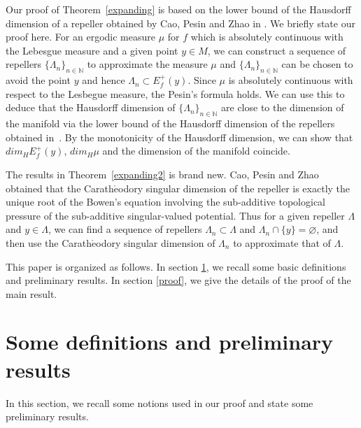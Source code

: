 \documentclass[11pt,a4paper]{amsart}
\theoremstyle{plain}
\theoremstyle{remark}
\begin{document}
	Our proof of Theorem~\ref{expanding} is based on the lower bound of the Hausdorff dimension of a repeller obtained by Cao, Pesin and Zhao in \cite{caopesinzhao2019}. We briefly state our proof here. For an ergodic measure $\mu$ for $f$ which is absolutely continuous with the Lebesgue measure and a given point $y\in M$, we can construct a sequence of repellers $\{\Lambda_n\}_{n\in\mathbb{N}}$  to approximate the measure $\mu$ and  $\{\Lambda_n\}_{n\in\mathbb{N}}$ can be chosen to avoid the point $y$ and hence $\Lambda_n \subset E^{+}_{f}(y)$. Since $\mu$ is absolutely continuous with respect to the Lesbegue measure, the Pesin's formula holds. We can use this to deduce that the Hausdorff dimension of $\{\Lambda_n\}_{n\in\mathbb{N}}$ are close to the dimension of the manifold via the lower bound of the Hausdorff dimension of the repellers obtained in~\cite{caopesinzhao2019}. By the monotonicity of the Hausdorff dimension, we can show that $dim_H E^{+}_{f}(y)$, $dim_H \mu$ and the dimension of the manifold coincide.
	
	The results in Theorem~\ref{expanding2} is brand new. Cao, Pesin and Zhao \cite{caopesinzhao2019} obtained that the Carath$\acute{\text{e}}$odory singular dimension of the repeller is exactly the unique root of the Bowen's equation involving the sub-additive topological pressure of the sub-additive singular-valued potential. Thus for a given repeller $\Lambda$ and $y\in \Lambda$, we can find a sequence of repellers $\Lambda_n\subset \Lambda$ and $\Lambda_n\cap \{y\}=\varnothing$, and then use  the Carath$\acute{\text{e}}$odory singular dimension of $\Lambda_n$ to approximate that of $\Lambda$.

	
	This paper is organized as follows. In section \ref{Preliminary}, we recall some basic definitions and preliminary results. In section \ref{proof}, we give the details of the proof of the main result.
	\section{Some definitions and preliminary results}\label{Preliminary}
	In this section, we recall some notions used in our proof and state some preliminary results.
\end{document}
